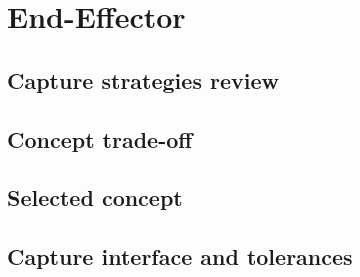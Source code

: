 \chapter{End-Effector}
\label{ch:end_effector}
\section{Capture strategies review}

\section{Concept trade-off}

\section{Selected concept}

\section{Capture interface and tolerances}
